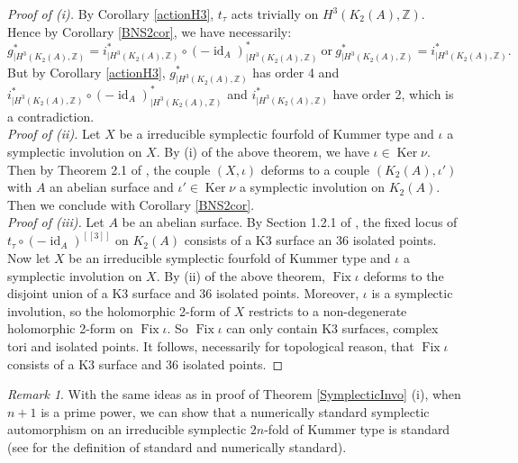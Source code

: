\documentclass{alggeom}
\DeclareMathOperator{\id}{id}
\DeclareMathOperator{\Ker}{Ker}
\DeclareMathOperator{\Fix}{Fix}
\newcommand{\Z}{\mathbb{Z}}
\theoremstyle{plain}
\theoremstyle{definition}
\theoremstyle{remark}
\newtheorem{rmk}[theorem]{Remark}
\begin{document}
\begin{proof}[Proof of (i)]
By Corollary \ref{actionH3}, $t_\tau$ acts trivially on $H^{3}(K_2(A),\Z)$. Hence by Corollary \ref{BNS2cor}, we have necessarily:
$$g^{*}_{|H^{3}(K_2(A),\Z)}=i^{*}_{|H^{3}(K_2(A),\Z)}\circ (-\id_A)^{*}_{|H^{3}(K_2(A),\Z)}\ \text{or}\ g^{*}_{|H^{3}(K_2(A),\Z)}=i^{*}_{|H^{3}(K_2(A),\Z)}.$$
But by Corollary \ref{actionH3}, $g^{*}_{|H^{3}(K_2(A),\Z)}$ has order 4 and $i^{*}_{|H^{3}(K_2(A),\Z)}\circ (-\id_A)^{*}_{|H^{3}(K_2(A),\Z)}$ and $i^{*}_{|H^{3}(K_2(A),\Z)}$ have order 2, which is a contradiction.
\vspace{3pt}\\
\emph{Proof of (ii).} 
Let $X$ be a irreducible symplectic fourfold of Kummer type and $\iota$ a symplectic involution on $X$. By (i) of the above theorem, we have $\iota\in\Ker \nu$. Then by Theorem 2.1 of \cite{Hassett}, the couple $(X,\iota)$ deforms to a couple $(K_2(A),\iota')$ with $A$ an abelian surface and $\iota'\in\Ker \nu$ a symplectic involution on $ K_2(A)$. Then we conclude with Corollary \ref{BNS2cor}.
\vspace{3pt}\\
\emph{Proof of (iii).} 
Let $A$ be an abelian surface. By Section 1.2.1 of \cite{Tari}, the fixed locus of $t_\tau \circ (-\id_A)^{[[3]]}$ on $K_2(A)$ consists of a K3 surface an 36 isolated points. 
Now let $X$ be an irreducible symplectic fourfold of Kummer type and $\iota$ a symplectic involution on $X$. 
By (ii) of the above theorem, $\Fix\iota$ deforms to the disjoint union of a K3 surface and 36 isolated points. 
Moreover, $\iota$ is a symplectic involution, so the holomorphic 2-form of $X$ restricts to a non-degenerate holomorphic 2-form on $\Fix\iota$. So $\Fix\iota$ can only contain K3 surfaces, complex tori and isolated points.
It follows, necessarily for topological reason, that $\Fix\iota$ consists of a K3 surface and 36 isolated points.
\end{proof}
\begin{rmk}
With the same ideas as in proof of Theorem \ref{SymplecticInvo} (i), when $n+1$ is a prime power, we can show that a numerically standard symplectic automorphism on an irreducible symplectic $2n$-fold of Kummer type is standard (see \cite{MongardiDef} for the definition of standard and numerically standard).
\end{rmk}
\end{document}
